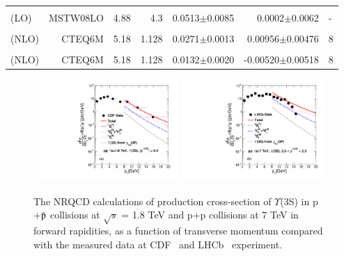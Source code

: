 \begin{table}
\begin{tabular*}{\textwidth}{@{\extracolsep{\fill}}lrrrrrl@{}}
    & & & & & & \\
    \cite{Sharma:2012dy} (LO) & MSTW08LO & 4.88 & 4.3 & 0.0513$\pm$0.0085 & 0.0002$\pm$0.0062 & -  \\
    & & & & & & \\
    \cite{Gong:2013qka} (NLO) & CTEQ6M & 5.18 & 1.128 & 0.0271$\pm$0.0013 & 0.00956$\pm$0.00476 & 8 \\
    & & & & & & \\
    \cite{Feng:2015wka} (NLO) & CTEQ6M & 5.18 & 1.128 & 0.0132$\pm$0.0020 & -0.00520$\pm$0.00518 & 8 \\
    \hline
    \hline
  \end{tabular*}
  \label{LDMEsY3S}
\end{table}
\normalsize

\begin{figure}
  \centering
  \includegraphics[width=0.49\textwidth]{Figures/NRQCD_Beauty/Fig4a_Y3S_CDF_180GeV_Rap2025.pdf}
  \includegraphics[width=0.49\textwidth]{Figures/NRQCD_Beauty/Fig4b_Y3S_LHCb_7TeV_Rap2025.pdf} 
  \caption{\small{The NRQCD calculations of production cross-section of $\Upsilon$(3S) in
      p +{$\bar {\rm p}$} collisions at $\sqrt{s}$ = 1.8 TeV and p+p collisions at
      7 TeV in forward rapidities, as a function of transverse momentum compared with the measured data 
      at CDF~\cite{Acosta:2001gv} and LHCb~\cite{LHCb:2012aa} experiment. }}
  \label{Fig:SigmaY3SCDF}
\end{figure}




